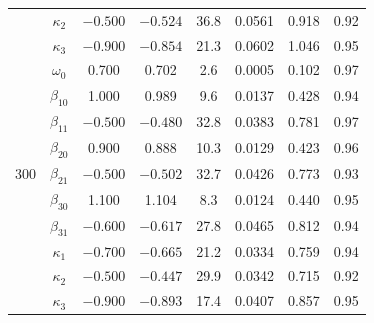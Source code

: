 \begin{table}[pos=htbp]
\begin{tabular}{@{}cccccccc@{}}
		 & $\kappa_2$ & $-0.500$ & $-0.524$ & 36.8 & 0.0561 & 0.918 & 0.92 \\
		 & $\kappa_3$ & $-0.900$ & $-0.854$ & 21.3 & 0.0602 & 1.046 & 0.95 \\
		\midrule
		 & $\omega_0$ & 0.700 & 0.702 & 2.6 & 0.0005 & 0.102 & 0.97 \\
		 & $\beta_{10}$ & 1.000 & 0.989 & 9.6 & 0.0137 & 0.428 & 0.94 \\
		 & $\beta_{11}$ & $-0.500$ & $-0.480$ & 32.8 & 0.0383 & 0.781 & 0.97 \\
		 & $\beta_{20}$ & 0.900 & 0.888 & 10.3 & 0.0129 & 0.423 & 0.96 \\
		300 & $\beta_{21}$ & $-0.500$ & $-0.502$ & 32.7 & 0.0426 & 0.773 & 0.93 \\
		 & $\beta_{30}$ & 1.100 & 1.104 & 8.3 & 0.0124 & 0.440 & 0.95 \\
		 & $\beta_{31}$ & $-0.600$ & $-0.617$ & 27.8 & 0.0465 & 0.812 & 0.94 \\
		 & $\kappa_1$ & $-0.700$ & $-0.665$ & 21.2 & 0.0334 & 0.759 & 0.94 \\
		 & $\kappa_2$ & $-0.500$ & $-0.447$ & 29.9 & 0.0342 & 0.715 & 0.92 \\
		 & $\kappa_3$ & $-0.900$ & $-0.893$ & 17.4 & 0.0407 & 0.857 & 0.95 \\
		\bottomrule
	\end{tabular}
\end{table}

